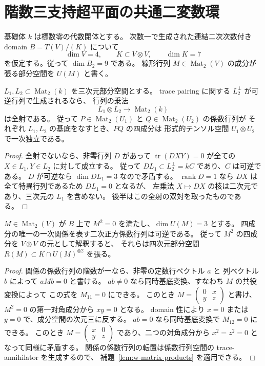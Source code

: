 \section{階数三支持超平面の共通二変数環}
\label{sec:common-plane}

基礎体 $k$ は標数零の代数閉体とする。
次数一で生成された連結二次次数付き domain $B=T(V)/(K)$ について
\[
 \dim V=4,\qquad K\subset V\otimes V,\qquad \dim K=7
\]
を仮定する。従って $\dim B_2=9$ である。
線形行列 $M\in\operatorname{Mat}_2(V)$ の成分が張る部分空間を $U(M)$ と書く。

\begin{lemma}[行列積の四成分の独立性]
\label{lem:w-matrix-products}
$L_1,L_2\subset\operatorname{Mat}_2(k)$ を三次元部分空間とする。
trace pairing に関する $L_2^\perp$ が可逆行列で生成されるなら、
行列の乗法
\[
 L_1\otimes L_2\longrightarrow\operatorname{Mat}_2(k)
\]
は全射である。
従って $P\in\operatorname{Mat}_2(U_1)$ と $Q\in\operatorname{Mat}_2(U_2)$ の係数行列が
それぞれ $L_1,L_2$ の基底をなすとき、$PQ$ の四成分は
形式的テンソル空間 $U_1\otimes U_2$ で一次独立である。
\end{lemma}
\begin{proof}
全射でないなら、非零行列 $D$ があって
$\operatorname{tr}(DXY)=0$ が全ての $X\in L_1,Y\in L_2$ に対して成立する。
従って $DL_1\subset L_2^\perp=kC$ であり、$C$ は可逆である。
$D$ が可逆なら $\dim DL_1=3$ なので矛盾する。
$\operatorname{rank} D=1$ なら $DX$ は全て特異行列であるため $DL_1=0$ となるが、
左乗法 $X\mapsto DX$ の核は二次元であり、三次元の $L_1$ を含めない。
後半はこの全射の双対を取ったものである。
\end{proof}

\begin{lemma}[平方零行列の成分の関係]
\label{lem:w-invertible-annihilator}
$M\in\operatorname{Mat}_2(V)$ が $B$ 上で $M^2=0$ を満たし、$\dim U(M)=3$ とする。
四成分の唯一の一次関係を表す二次正方係数行列は可逆である。
従って $M^2$ の四成分を $V\otimes V$ の元として解釈すると、
それらは四次元部分空間 $R(M)\subset K\cap U(M)^{\otimes2}$ を張る。
\end{lemma}
\begin{proof}
関係の係数行列の階数が一なら、非零の定数行ベクトル $a$ と
列ベクトル $b$ によって $aMb=0$ と書ける。
$ab\ne0$ なら同時基底変換、すなわち $M$ の共役変換によって
この式を $M_{11}=0$ にできる。
このとき $M=\left(\begin{smallmatrix}0&x\\y&z\end{smallmatrix}\right)$
と書け、$M^2=0$ の第一対角成分から $xy=0$ となる。
domain 性により $x=0$ または $y=0$ で、成分空間の次元三に反する。
$ab=0$ なら同時基底変換で $M_{12}=0$ にできる。
このとき $M=\left(\begin{smallmatrix}x&0\\y&z\end{smallmatrix}\right)$
であり、二つの対角成分から $x^2=z^2=0$ となって同様に矛盾する。
関係の係数行列の転置は係数行列空間の trace-annihilator を生成するので、
補題~\ref{lem:w-matrix-products} を適用できる。
\end{proof}

